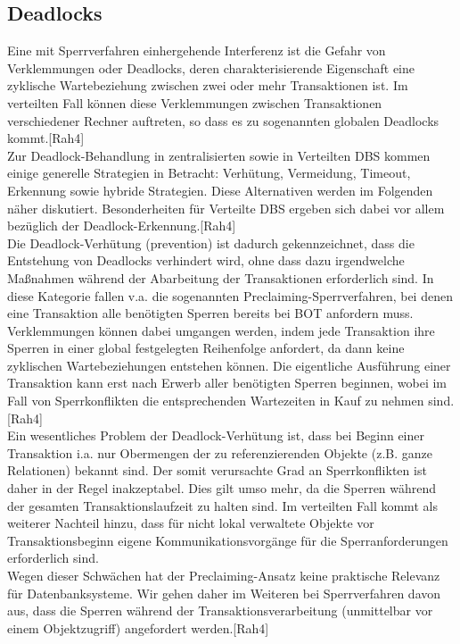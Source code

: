 \documentclass[letterpaper, 12pt]{article}
\let\tempsubsection\subsection
\renewcommand\subsection[1]{\vspace{0cm}\tempsubsection{#1}\vspace{0cm}}
\begin{document}
\subsection{Deadlocks}
Eine mit Sperrverfahren einhergehende Interferenz ist die Gefahr von Verklemmungen oder Deadlocks, deren charakterisierende Eigenschaft eine zyklische Wartebeziehung zwischen zwei oder mehr Transaktionen ist. Im verteilten Fall können diese Verklemmungen zwischen Transaktionen verschiedener Rechner auftreten, so dass es zu sogenannten globalen Deadlocks kommt.[Rah4]\\
Zur Deadlock-Behandlung in zentralisierten sowie in Verteilten DBS kommen einige generelle Strategien in Betracht: Verhütung, Vermeidung, Timeout, Erkennung sowie hybride Strategien. Diese Alternativen werden im Folgenden näher diskutiert. Besonderheiten für Verteilte DBS ergeben sich dabei vor allem bezüglich der Deadlock-Erkennung.[Rah4]\\
Die Deadlock-Verhütung (prevention) ist dadurch gekennzeichnet, dass die Entstehung von Deadlocks verhindert wird, ohne dass dazu irgendwelche Maßnahmen während der Abarbeitung der Transaktionen erforderlich sind. In diese Kategorie fallen v.a. die sogenannten Preclaiming-Sperrverfahren, bei denen eine Transaktion alle benötigten Sperren bereits bei BOT anfordern muss. Verklemmungen können dabei umgangen werden, indem jede Transaktion ihre Sperren in einer global festgelegten Reihenfolge anfordert, da dann keine zyklischen Wartebeziehungen entstehen können. Die eigentliche Ausführung einer Transaktion kann erst nach Erwerb aller benötigten Sperren beginnen, wobei im Fall von Sperrkonflikten die entsprechenden Wartezeiten in Kauf zu nehmen sind.[Rah4]
\\
Ein wesentliches Problem der Deadlock-Verhütung ist, dass bei Beginn einer Transaktion i.a. nur Obermengen der zu referenzierenden Objekte (z.B. ganze Relationen) bekannt sind. Der somit verursachte Grad an Sperrkonflikten ist daher in der Regel inakzeptabel. Dies gilt umso mehr, da die Sperren während der gesamten Transaktionslaufzeit zu halten sind. Im verteilten Fall kommt als weiterer Nachteil hinzu, dass für nicht lokal verwaltete Objekte vor Transaktionsbeginn eigene Kommunikationsvorgänge für die Sperranforderungen erforderlich sind.\\
Wegen dieser Schwächen hat der Preclaiming-Ansatz keine praktische Relevanz für Datenbanksysteme. Wir gehen daher im Weiteren bei Sperrverfahren davon aus, dass die Sperren während der Transaktionsverarbeitung (unmittelbar vor einem Objektzugriff) angefordert werden.[Rah4]
\newpage
\end{document}
